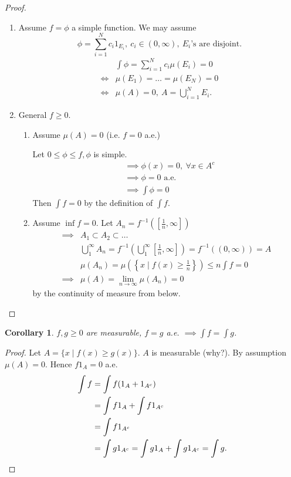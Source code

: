 \documentclass{report}
\newtheorem{corollary}[theorem]{Corollary}
\theoremstyle{definition}
\theoremstyle{remark}
\begin{document}
\begin{proof}
	\begin{enumerate}
		\item Assume $f = \phi$ a simple function. We may assume \[\phi = \sum_{i=1}^N c_i1_{E_i},\ c_i \in (0, \infty),\ E_i\text{'s are disjoint.}\]
		\begin{align*}
			& \int \phi = \sum_{i=1}^N c_i \mu(E_i) = 0 \\
		\iff & \mu(E_1) = \ldots = \mu(E_N) = 0 \\
		\iff & \mu(A) = 0,\ A = \bigcup_{i=1}^N E_i.
		\end{align*}

		\item General $f \geq 0$. \begin{enumerate}
			\item Assume $\mu(A) = 0$ (i.e. $f = 0$ a.e.)
			
			Let $0 \leq \phi \leq f, \phi$ is simple.
			\begin{align*}
				& \implies \phi(x) = 0,\ \forall x \in A^c \\
				& \implies \phi = 0 \text{ a.e.} \\
				& \implies \int \phi = 0
			\end{align*}
			Then $\int f = 0$ by the definition of $\int f$.

			\item Assume $\inf f = 0$. Let $A_n = f^{-1}\left(\left[\frac{1}{n}, \infty\right]\right)$
			\begin{align*}
				\implies & A_1 \subset A_2 \subset \ldots \\
				& \bigcup_1^\infty A_n = f^{-1}\left(\bigcup_1^\infty\left[\frac{1}{n}, \infty\right]\right) = f^{-1}((0, \infty)) = A \\
				& \mu(A_n) = \mu\left(\left\lbrace x \mid f(x) \geq \frac{1}{n}\right\rbrace\right) \leq n \int f = 0 \\
				\implies & \mu(A) = \lim_{n \to \infty} \mu(A_n) = 0
			\end{align*}
			by the continuity of measure from below. \qedhere
		\end{enumerate}
	\end{enumerate}
\end{proof}

\begin{corollary}
	$f, g \geq 0$ are measurable, $f = g$ a.e. $\implies \int f = \int g$.
\end{corollary}
\begin{proof}
	Let $A = \{x \mid f(x) \geq g(x)\}$. $A$ is measurable (why?). By assumption $\mu(A) = 0$. Hence $f1_A = 0$ a.e.
	\begin{align*}
		\int f & = \int f(1_A + 1_{A^c}) \\
		& = \int f1_A + \int f1_{A^c} \\
		& = \int f1_{A^c} \\
		& = \int g1_{A^c} = \int g1_{A} + \int g1_{A^c} = \int g. \qedhere
	\end{align*}
\end{proof}
\end{document}
